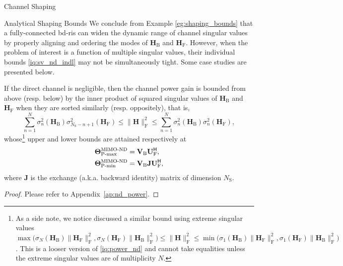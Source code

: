 \documentclass[journal]{IEEEtran}
\begin{document}
\begin{section}{Channel Shaping}
\begin{subsection}{Analytical Shaping Bounds}
		We conclude from Example \ref{eg:shaping_bounds} that a fully-connected \gls{bd}-\gls{ris} can widen the dynamic range of channel singular values by properly aligning and ordering the modes of $\mathbf{H}_\mathrm{B}$ and $\mathbf{H}_\mathrm{F}$.
		However, when the problem of interest is a function of multiple singular values, their individual bounds \eqref{iq:sv_nd_indl} may not be simultaneously tight.
		Some case studies are presented below.

		\begin{corollary}
			\label{co:nd_power}
			If the direct channel is negligible, then the channel power gain is bounded from above (resp. below) by the inner product of squared singular values of $\mathbf{H}_\mathrm{B}$ and $\mathbf{H}_\mathrm{F}$ when they are sorted similarly (resp. oppositely), that is,
			\begin{equation}
				\label{iq:power_nd}
				\sum_{n=1}^N \sigma_n^2(\mathbf{H}_\mathrm{B}) \sigma_{N_\mathrm{S}-n+1}^2(\mathbf{H}_\mathrm{F}) \le \lVert \mathbf{H} \rVert _\mathrm{F}^2 \le \sum_{n=1}^N \sigma_n^2(\mathbf{H}_\mathrm{B}) \sigma_n^2(\mathbf{H}_\mathrm{F}),
			\end{equation}
			whose\footnote{As a side note, we notice \cite{Fang1994} discussed a similar bound using extreme singular values $\max\bigl(\sigma_{N}(\mathbf{H}_\mathrm{B}) \lVert \mathbf{H}_\mathrm{F} \rVert _\mathrm{F}^2, \sigma_{N}(\mathbf{H}_\mathrm{F}) \lVert \mathbf{H}_\mathrm{B} \rVert _\mathrm{F}^2\bigr) \le \lVert \mathbf{H} \rVert _\mathrm{F}^2 \le \min\bigl(\sigma_1(\mathbf{H}_\mathrm{B}) \lVert \mathbf{H}_\mathrm{F} \rVert _\mathrm{F}^2, \sigma_1(\mathbf{H}_\mathrm{F}) \lVert \mathbf{H}_\mathrm{B} \rVert _\mathrm{F}^2\bigr)$. This is a looser version of \eqref{iq:power_nd} and cannot take equalities unless the extreme singular values are of multiplicity $N$.} upper and lower bounds are attained respectively at
			\begin{subequations}
				\begin{align}
					\mathbf{\Theta}_\textnormal{P-max}^\textnormal{MIMO-ND} & = \mathbf{V}_\mathrm{B} \mathbf{U}_\mathrm{F}^\mathsf{H}, \label{eq:ris_nd_power_max}            \\
					\mathbf{\Theta}_\textnormal{P-min}^\textnormal{MIMO-ND} & = \mathbf{V}_\mathrm{B} \mathbf{J} \mathbf{U}_\mathrm{F}^\mathsf{H} \label{eq:ris_nd_power_min},
				\end{align}
			\end{subequations}
			where $\mathbf{J}$ is the exchange (a.k.a. backward identity) matrix of dimension $N_\mathrm{S}$.
		\end{corollary}
		\begin{proof}
			Please refer to Appendix~\ref{ap:nd_power}.
		\end{proof}


\end{subsection}
\end{section}
\end{document}
